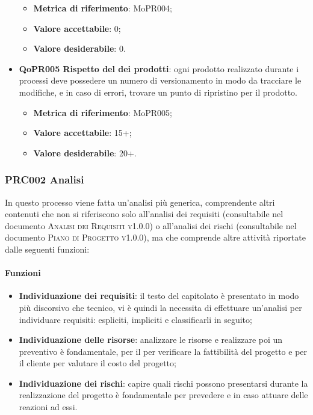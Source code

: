 \documentclass[../piano-di-qualifica.tex]{subfiles}
\begin{document}
\begin{itemize}
        \begin{itemize}
            \item \textbf{Metrica di riferimento}: MoPR004;
            \item \textbf{Valore accettabile}: 0; %
            \item \textbf{Valore desiderabile}: 0.
        \end{itemize}
    \item \textbf{QoPR005 Rispetto del  dei prodotti}: ogni prodotto realizzato durante i processi deve possedere un numero di versionamento in modo da tracciare le modifiche, e in caso di errori, trovare un punto di ripristino per il prodotto.
        \begin{itemize}
            \item \textbf{Metrica di riferimento}: MoPR005;
            \item \textbf{Valore accettabile}: 15+; %
            \item \textbf{Valore desiderabile}: 20+.
        \end{itemize}
\end{itemize}

\subsubsection{PRC002 Analisi}
\label{sub:analisi}
In questo processo viene fatta un'analisi più generica, comprendente altri contenuti che non si riferiscono solo all'analisi dei requisiti (consultabile nel documento \textsc{Analisi dei Requisiti v1.0.0}) o all'analisi dei rischi (consultabile nel documento \textsc{Piano di Progetto v1.0.0}), ma che comprende altre attività riportate dalle seguenti funzioni:

\paragraph{Funzioni}
\label{sub:funzioni_2}
\begin{itemize}
    \item \textbf{Individuazione dei requisiti}: il testo del capitolato è presentato in modo più discorsivo che tecnico, vi è quindi la necessita di effettuare un'analisi per individuare requisiti: espliciti, impliciti e classificarli in seguito;
    \item \textbf{Individuazione delle risorse}: analizzare le risorse e realizzare poi un preventivo è fondamentale, per il  per verificare la fattibilità del progetto e per il cliente per valutare il costo del progetto;
    \item \textbf{Individuazione dei rischi}: capire quali rischi possono presentarsi durante la realizzazione del progetto è fondamentale per prevedere e in caso attuare delle reazioni ad essi.
\end{itemize}
\end{document}
